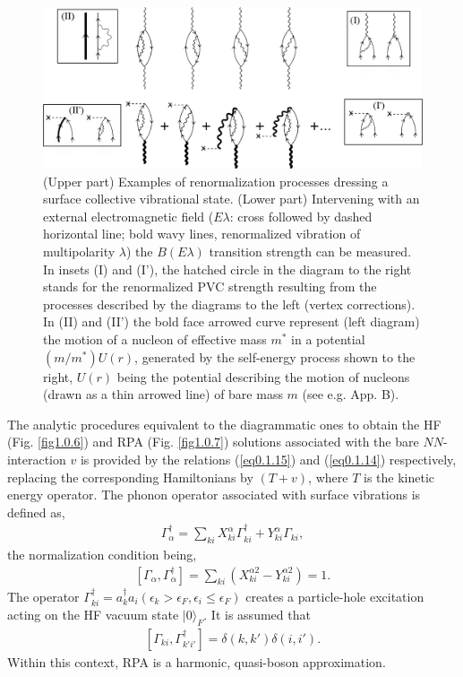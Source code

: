 \documentclass[a4paper,11pt]{book}
\numberwithin{equation}{section}
\numberwithin{figure}{section}
\numberwithin{table}{section}
\newcommand{\ket}[1]{|{#1} \rangle }
\begin{document}
\begin{figure}
	\centerline {
		\includegraphics*[width=15cm]{introduccion/figs/figpreface9}
	}
	\caption{(Upper part) Examples of renormalization processes dressing a surface collective vibrational state. (Lower part) Intervening with an external electromagnetic field ($E\lambda$: cross followed by dashed horizontal line; bold wavy lines, renormalized vibration of multipolarity $\lambda$) the $B(E\lambda)$ transition strength can be measured. In insets (I) and (I'), the hatched circle in the diagram to the right stands for the renormalized PVC strength resulting from the processes described by the diagrams to the left (vertex corrections). In (II) and (II') the bold face arrowed curve represent (left diagram) the motion of a nucleon of effective mass $m^*$ in a potential $(m/m^*)U(r)$, generated by the self-energy process shown to the right, $U(r)$  being the potential describing the motion of nucleons (drawn as a thin  arrowed line) of bare mass $m$  (see e.g. \cite{Brink:05} App. B).}
	\label{fig1.0.9}
\end{figure}

The analytic procedures equivalent  to the diagrammatic ones to obtain the HF (Fig. \ref{fig1.0.6}) and RPA (Fig. \ref{fig1.0.7}) solutions associated with the bare $NN$-interaction $v$ is provided by the relations (\ref{eq0.1.15}) and (\ref{eq0.1.14}) respectively, replacing the corresponding Hamiltonians by $(T+v)$, where $T$ is the kinetic energy operator. The phonon operator associated with surface vibrations is defined as,
\begin{align}\label{eq1.0.26}
\Gamma_\alpha^\dagger=\sum_{ki}X_{ki}^\alpha\Gamma_{ki}^\dagger+Y_{ki}^\alpha\Gamma_{ki},
\end{align}
 the normalization condition being, 
\begin{align}\label{eq1.0.27}
\left[\Gamma_\alpha,\Gamma_\alpha^\dagger\right]=\sum_{ki}\left(X_{ki}^{\alpha2}-Y_{ki}^{\alpha2}\right)=1.
\end{align}
The operator $\Gamma^\dagger_{ki}=a^\dagger_{k}a_{i} (\epsilon_k>\epsilon_F,\epsilon_i\leq\epsilon_F)$ creates a particle-hole excitation acting on the HF vacuum state $\ket{0}_F$. It is assumed that
\begin{align}\label{eq1.0.28}
\left[\Gamma_{ki},\Gamma_{k'i'}^\dagger\right]=\delta(k,k')\delta(i,i').
\end{align}
Within this context, RPA is a harmonic, quasi-boson approximation.
\end{document}
